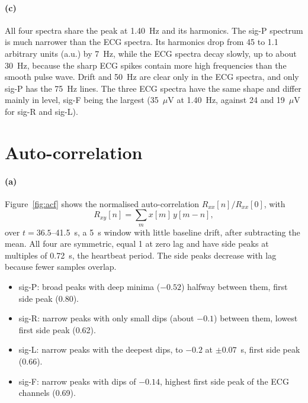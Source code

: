 \documentclass[11pt,a4paper]{article}
\begin{document}
\paragraph{(c)} All four spectra share the peak at 1.40~Hz and its harmonics. The
sig-P spectrum is much narrower than the ECG spectra. Its harmonics drop from 45 to
1.1 arbitrary units (a.u.) by 7~Hz, while the ECG spectra decay slowly, up to about 30~Hz, because the sharp ECG
spikes contain more high frequencies than the smooth pulse wave. Drift and 50~Hz are clear only in
the ECG spectra, and only sig-P has the 75~Hz lines. The three ECG spectra have the same shape
and differ mainly in level, sig-F being the largest (35~$\mu$V at 1.40~Hz, against 24 and
19~$\mu$V for sig-R and sig-L).

\section{Auto-correlation}\label{sec:acf}
\paragraph{(a)} Figure~\ref{fig:acf} shows the normalised auto-correlation
$R_{xx}[n]/R_{xx}[0]$, with
\[
  R_{xy}[n] = \sum_m x[m]\,y[m-n],
\]
over $t = 36.5$--41.5~s, a 5~s window with little baseline drift, after subtracting the mean.
All four are symmetric, equal 1 at zero lag and have side peaks at multiples
of 0.72~s, the heartbeat period. The side peaks decrease with lag because fewer samples overlap.
\begin{itemize}
  \item sig-P: broad peaks with deep minima ($-0.52$) halfway between them, first side peak
        (0.80).
  \item sig-R: narrow peaks with only small dips (about $-0.1$) between them, lowest first
        side peak (0.62).
  \item sig-L: narrow peaks with the deepest dips, to $-0.2$ at $\pm 0.07$~s, first side peak
        (0.66).
  \item sig-F: narrow peaks with dips of $-0.14$, highest first side peak of the ECG channels
        (0.69).
\end{itemize}
\end{document}
